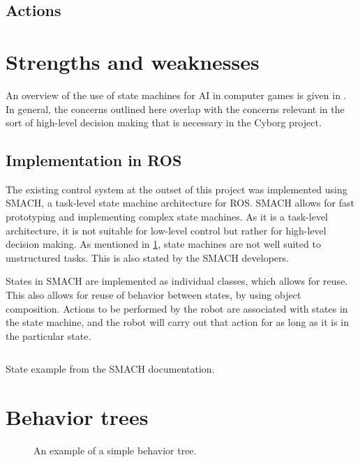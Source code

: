 \documentclass[\rootfolder/main.tex]{subfiles}
\begin{document}
\subsection{Actions}

\section{Strengths and weaknesses}
\label{sec:state_machine_strength_weaknesses}

An overview of the use of state machines for AI in computer games is given in \cite{Millington2009}.
In general, the concerns outlined here overlap with the concerns relevant in the sort of high-level decision making that is necessary in the Cyborg project.

\subsection{Implementation in ROS}

The existing control system at the outset of this project was implemented using SMACH, a task-level state machine architecture for ROS.
SMACH allows for fast prototyping and implementing complex state machines.
As it is a task-level architecture, it is not suitable for low-level control but rather for high-level decision making.
As mentioned in \cref{sec:state_machine_strength_weaknesses}, state machines are not well suited to unstructured tasks.
This is also stated by the SMACH developers.

States in SMACH are implemented as individual classes, which allows for reuse.
This also allows for reuse of behavior between states, by using object composition.
Actions to be performed by the robot are associated with states in the state machine, and the robot will carry out that action for as long as it is in the particular state.

\begin{listing}
\inputminted{python}{\rootfolder/Chapters/Chapter2/Listings/smachstate.py}
\caption{State example from the SMACH documentation.}
\end{listing}

\section{Behavior trees}

\begin{wrapfigure}{L}{0.5\columnwidth}
    \caption{An example of a simple behavior tree.}
    \label{fig:bt}
\end{wrapfigure}
\end{document}
